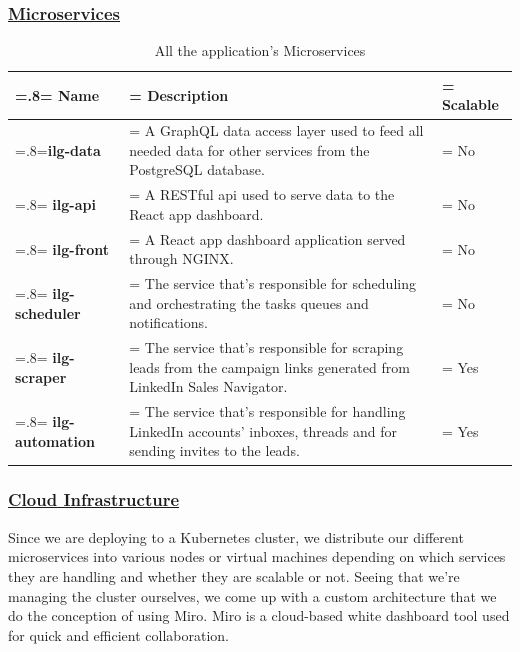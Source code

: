 \subsubsection*{\underline{Microservices}}
\begin{table}[H]
	\renewcommand{\arraystretch}{1.5}%
	\caption{All the application's Microservices}
	\centering
	\medskip
	\begin{tabularx}{1\textwidth} {
			| >{\hsize=.8\hsize\linewidth=\hsize\centering\arraybackslash}X
			| >{\hsize=1.75\hsize\linewidth=\hsize\justifying\arraybackslash}X
			| >{\hsize=0.45\hsize\linewidth=\hsize\centering\arraybackslash}X |}
		\hline
		\rowcolor{primary} \textbf{Name} & \noindent \textbf{Description}                                                                                                  & \textbf{Scalable} \\
		\hline
		\textbf {ilg-data}               & \noindent A GraphQL data access layer used to feed all needed data for other services from the PostgreSQL database.             & No                \\
		\hline
		\textbf {ilg-api}                & \noindent A RESTful api used to serve data to the React app dashboard.                                                          & No                \\
		\hline
		\textbf {ilg-front}              & \noindent A React app dashboard application served through NGINX.                                                               & No                \\
		\hline
		\textbf {ilg-scheduler}          & \noindent The service that's responsible for scheduling and orchestrating the tasks queues and notifications.                   & No                \\
		\hline
		\textbf {ilg-scraper}            & \noindent The service that's responsible for scraping leads from the campaign links generated from LinkedIn Sales Navigator.    & Yes               \\
		\hline
		\textbf {ilg-automation}         & \noindent The service that's responsible for handling LinkedIn accounts' inboxes, threads and for sending invites to the leads. & Yes               \\
		\hline
	\end{tabularx}
\end{table}

\subsubsection*{\underline{Cloud Infrastructure}}
Since we are deploying to a Kubernetes cluster, we distribute our different microservices into various nodes or virtual machines depending on which services they are handling and whether they are scalable or not.
Seeing that we're managing the cluster ourselves, we come up with a custom architecture that we do the conception of using Miro.
Miro is a cloud-based white dashboard tool used for quick and efficient collaboration.

